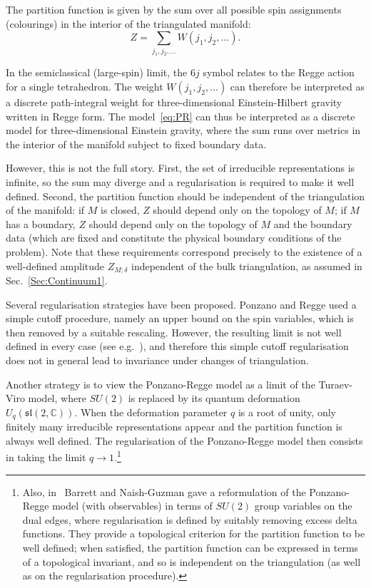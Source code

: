 \documentclass[11pt]{article}
\newcommand{\C}{\mathbb{C}}
\theoremstyle{definition}
\numberwithin{equation}{section}
\begin{document}
The partition function is given by the sum over all possible spin assignments (colourings) in the interior of the triangulated manifold:
\begin{equation}
\label{eq:PR}
Z=\sum_{j_1, j_2, \dots}W(j_1, j_2, \dots).
\end{equation}

In the semiclassical (large-spin) limit, the $6j$ symbol relates to the Regge action for a single tetrahedron. The weight $W(j_1, j_2, \dots)$ can therefore be interpreted as a discrete path-integral weight for three-dimensional Einstein-Hilbert gravity written in Regge form. The model~\eqref{eq:PR} can thus be interpreted as a discrete model for three-dimensional Einstein gravity, where the sum runs over metrics in the interior of the manifold subject to fixed boundary data.

However, this is not the full story. First, the set of irreducible representations is infinite, so the sum may diverge and a regularisation is required to make it well defined. Second, the partition function should be independent of the triangulation of the manifold: if $M$ is closed, $Z$ should depend only on the topology of $M$; if $M$ has a boundary, $Z$ should depend only on the topology of $M$ and the boundary data (which are fixed and constitute the physical boundary conditions of the problem). Note that these requirements correspond precisely to the existence of a well-defined amplitude $Z_{M;\delta}$ independent of the bulk triangulation, as assumed in Sec.~\ref{Sec:Continuum1}.

Several regularisation strategies have been proposed. Ponzano and Regge used a simple cutoff procedure, namely an upper bound on the spin variables, which is then removed by a suitable rescaling. However, the resulting limit is not well defined in every case (see e.g.~\cite{Barrett_Naish-Guzman_2008}), and therefore this simple cutoff regularisation does not in general lead to invariance under changes of triangulation.

Another strategy is to view the Ponzano-Regge model as a limit of the Turaev-Viro model, where $SU(2)$ is replaced by its quantum deformation $U_q(\mathfrak{sl}(2,\C))$. When the deformation parameter $q$ is a root of unity, only finitely many irreducible representations appear and the partition function is always well defined. The regularisation of the Ponzano-Regge model then consists in taking the limit $q\to 1$.\footnote{Also, in~\cite{Barrett_Naish-Guzman_2008} Barrett and Naish-Guzman gave a reformulation of the Ponzano-Regge model (with observables) in terms of $SU(2)$ group variables on the dual edges, where regularisation is defined by suitably removing excess delta functions. They provide a topological criterion for the partition function to be well defined; when satisfied, the partition function can be expressed in terms of a topological invariant, and so is independent on the triangulation (as well as on the regularisation procedure).}
\end{document}
